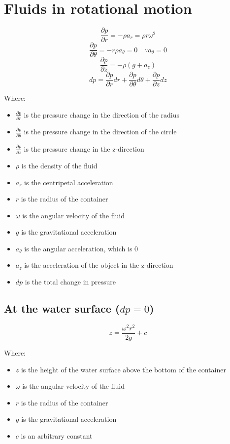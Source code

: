 \documentclass[11pt]{article}
\begin{document}
\newpage

\section{Fluids in rotational motion}
\label{sec:org2df468a}
\[\frac{\partial p}{\partial r} = - \rho a_r = \rho r \omega^2\]
\[\frac{\partial p}{\partial \theta} = - r\rho a_{\theta} = 0 \quad \because a_{\theta} = 0\]
\[\frac{\partial p}{\partial z} = - \rho (g + a_z)\]
\[dp = \frac{\partial p}{\partial r} dr + \frac{\partial p}{\partial \theta} d \theta + \frac{\partial p}{\partial z} dz\]

Where:
\begin{itemize}
\item \(\frac{\partial p}{\partial r}\) is the pressure change in the direction of the radius
\item \(\frac{\partial p}{\partial \theta}\) is the pressure change in the direction of the circle
\item \(\frac{\partial p}{\partial z}\) is the pressure change in the z-direction
\item \(\rho\) is the density of the fluid
\item \(a_r\) is the centripetal acceleration
\item \(r\) is the radius of the container
\item \(\omega\) is the angular velocity of the fluid
\item \(g\) is the gravitational acceleration
\item \(a_{\theta}\) is the angular acceleration, which is 0
\item \(a_z\) is the acceleration of the object in the z-direction
\item \(dp\) is the total change in pressure
\end{itemize}

\newpage

\subsection{At the water surface (\(dp = 0\))}
\label{sec:org2bdb44d}
\[z = \frac{\omega^2 r^2}{2g} + c\]

Where:
\begin{itemize}
\item \(z\) is the height of the water surface above the bottom of the container
\item \(\omega\) is the angular velocity of the fluid
\item \(r\) is the radius of the container
\item \(g\) is the gravitational acceleration
\item \(c\) is an arbitrary constant
\end{itemize}
\end{document}
